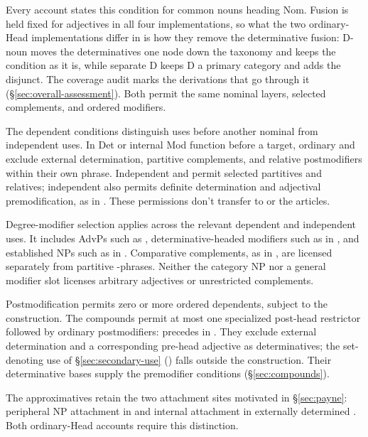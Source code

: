 \documentclass[12pt]{article}
\begin{document}
Every account states this condition for common nouns heading Nom. Fusion is held fixed for adjectives in all four implementations, so what the two ordinary-Head implementations differ in is how they remove the determinative fusion: D-noun moves the determinatives one node down the taxonomy and keeps the condition as it is, while separate D keeps D a primary category and adds the disjunct. The coverage audit marks the derivations that go through it (§\ref{sec:overall-assessment}). Both permit the same nominal layers, selected complements, and ordered modifiers.

The dependent conditions distinguish uses before another nominal from independent uses. In Det or internal Mod function before a target, ordinary  and  exclude external determination, partitive complements, and relative postmodifiers within their own phrase. Independent  and  permit selected partitives and relatives; independent  also permits definite determination and adjectival premodification, as in . These permissions don't transfer to  or the articles.

Degree-modifier selection applies across the relevant dependent and independent uses. It includes AdvPs such as , determinative-headed modifiers such as  in , and established NPs such as  in . Comparative complements, as in , are licensed separately from partitive -phrases. Neither the category NP nor a general modifier slot licenses arbitrary adjectives or unrestricted complements.

Postmodification permits zero or more ordered dependents, subject to the construction. The compounds permit at most one specialized post-head restrictor followed by ordinary postmodifiers:  precedes  in . They exclude external determination and a corresponding pre-head adjective as determinatives; the set-denoting use of §\ref{sec:secondary-use} () falls outside the construction. Their determinative bases supply the premodifier conditions (§\ref{sec:compounds}).

The approximatives retain the two attachment sites motivated in §\ref{sec:payne}: peripheral NP attachment in  and internal attachment in externally determined . Both ordinary-Head accounts require this distinction.
\end{document}
